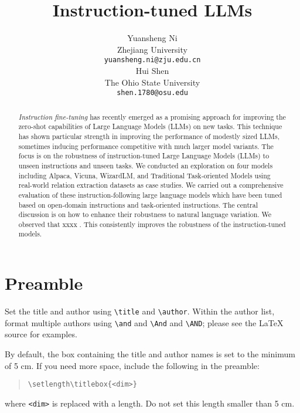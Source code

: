 \documentclass[11pt]{article}
\title{Instruction-tuned LLMs}
\author{%
Yuansheng Ni \\
  Zhejiang University\\
  \texttt{yuansheng.ni@zju.edu.cn} \\
  \And 
  Hui Shen \\
  The Ohio State University\\
  \texttt{shen.1780@osu.edu}
}
\begin{document}
\maketitle
\begin{abstract}
  \emph{Instruction fine-tuning} has recently emerged as a promising approach for improving the zero-shot capabilities of Large Language Models (LLMs) on new tasks.
  This technique has shown particular strength in improving the performance of modestly sized LLMs, sometimes inducing performance competitive with much larger model variants.
  The focus is on the robustness of instruction-tuned Large Language Models (LLMs) to unseen instructions and unseen tasks.
  We conducted an exploration on four models including Alpaca, Vicuna, WizardLM, and Traditional Task-oriented Models using real-world relation extraction datasets as case studies.
  We carried out a comprehensive evaluation of these instruction-following large language models which have been tuned based on open-domain instructions and task-oriented instructions.
  The central discussion is on how to enhance their robustness to natural language variation.
  We observed that xxxx  .
  This consistently improves the robustness of the instruction-tuned models.

\end{abstract}








\section{Preamble}


Set the title and author using \verb|\title| and \verb|\author|. Within the author list, format multiple authors using \verb|\and| and \verb|\And| and \verb|\AND|; please see the \LaTeX{} source for examples.

By default, the box containing the title and author names is set to the minimum of 5 cm. If you need more space, include the following in the preamble:
\begin{quote}
  \begin{verbatim}
\setlength\titlebox{<dim>}
\end{verbatim}
\end{quote}
where \verb|<dim>| is replaced with a length. Do not set this length smaller than 5 cm.
\end{document}
